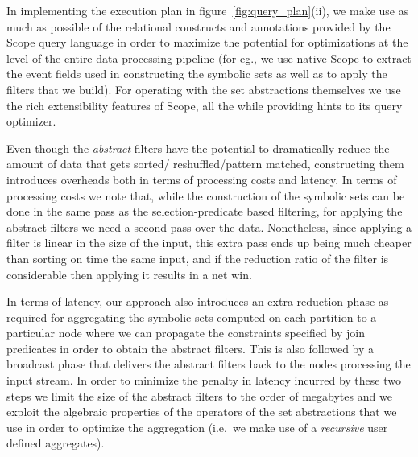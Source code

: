 In implementing the execution plan in figure~\ref{fig:query_plan}(ii),
we make use as much as possible of the relational constructs and annotations 
provided by the Scope query language in order to maximize the potential for 
optimizations at the level of the entire data processing pipeline (for eg., we 
use native Scope to extract the event fields used in constructing the symbolic 
sets as well as to apply the filters that we build).
For operating with the set abstractions themselves we use the rich 
extensibility features of Scope, all the while providing hints to its query 
optimizer.

Even though the {\em abstract} filters have the potential to dramatically 
reduce the amount of data that gets sorted\allowbreak /\allowbreak 
reshuffled\allowbreak /\allowbreak pattern matched, 
constructing them introduces overheads both in terms of processing costs and 
latency.
In terms of processing costs we note that, while the construction of the 
symbolic sets can be done in the same pass as the selection-predicate based 
filtering, for applying the abstract filters we need a second pass over the 
data.
Nonetheless, since applying a filter is linear in the size of the input, this 
extra pass ends up being much cheaper than sorting on time the same input, and 
if the reduction ratio of the filter is considerable then applying it results 
in a net win. 
   
In terms of latency, our approach also introduces an extra reduction phase as 
required for aggregating the symbolic sets computed on each partition to a 
particular node where we can propagate the constraints specified by join 
predicates in order to obtain the abstract filters.
This is also followed by a broadcast phase that delivers the abstract filters 
back to the nodes processing the input stream.
In order to minimize the penalty in latency incurred by these two steps we 
limit the size of the abstract filters to the order of megabytes and we exploit 
the algebraic properties of the operators of the set abstractions that we use 
in order to optimize the aggregation (i.e.\ we make use of a {\em recursive} 
user defined aggregates).





  
  
  
  